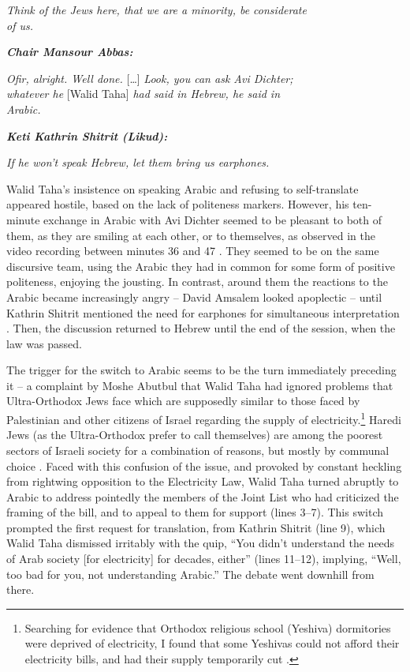 \documentclass[output=paper,arabicfont]{langscibook}
\begin{document}
\begin{exe}
\begin{linenumbers*}
\textit{Think of the Jews here, that we are a minority, be considerate\\
of us.}

\textit{\textbf{Chair Mansour Abbas:}}

\textit{Ofir, alright. Well done.} […] \textit{Look, you can ask Avi Dichter;\\
whatever he} [Walid Taha] \textit{had said in Hebrew, he said in\\
Arabic.}

\textit{\textbf{Keti Kathrin Shitrit (Likud):}}

\textit{If he won’t speak Hebrew, let them bring us earphones.}
 \end{linenumbers*}
\end{exe}

Walid Taha’s insistence on speaking Arabic and refusing to self-translate appeared hostile, based on the lack of politeness markers. However, his ten-minute exchange in Arabic with Avi Dichter seemed to be pleasant to both of them, as they are smiling at each other, or to themselves, as observed in the video recording between minutes 36 and 47 \citep{knesset2022-c}. They seemed to be on the same discursive team, using the Arabic they had in common for some form of positive politeness, enjoying the jousting. In contrast, around them the reactions to the Arabic became increasingly angry – David Amsalem looked apoplectic – until Kathrin Shitrit mentioned the need for earphones for simultaneous interpretation \citep[131]{knesset2022-a}. Then, the discussion returned to Hebrew until the end of the session, when the law was passed. 

The trigger for the switch to Arabic seems to be the turn immediately preceding it – a complaint by Moshe Abutbul that Walid Taha had ignored problems that Ultra-Orthodox Jews face which are supposedly similar to those faced by Palestinian and other citizens of Israel regarding the supply of electricity.\footnote{Searching for evidence that Orthodox religious school (Yeshiva) dormitories were deprived of electricity, I found that some Yeshivas could not afford their electricity bills, and had their supply temporarily cut \citep{bureau2014a}.} Haredi Jews (as the Ultra-Orthodox prefer to call themselves) are among the poorest sectors of Israeli society for a combination of reasons, but mostly by communal choice \citep[14]{o2020a}. Faced with this confusion of the issue, and provoked by constant heckling from rightwing opposition to the Electricity Law, Walid Taha turned abruptly to Arabic to address pointedly the members of the Joint List who had criticized the framing of the bill, and to appeal to them for support (lines 3–7). This switch prompted the first request for translation, from Kathrin Shitrit (line 9), which Walid Taha dismissed irritably with the quip, “You didn’t understand the needs of Arab society [for electricity] for decades, either” (lines 11–12), implying, “Well, too bad for you, not understanding Arabic.” The debate went downhill from there. 
\end{document}
